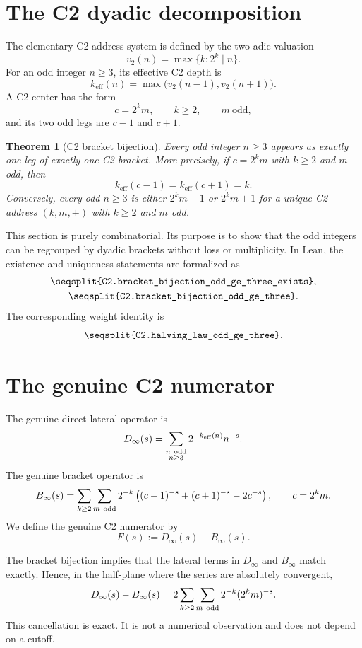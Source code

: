 \documentclass[11pt]{article}
\newtheorem{theorem}{Theorem}[section]
\newcommand{\Lean}[1]{\texttt{\seqsplit{#1}}}
\begin{document}
\section{The C2 dyadic decomposition}

The elementary C2 address system is defined by the two-adic valuation
\[
  v_2(n)=\max\{k:2^k\mid n\}.
\]
For an odd integer \(n\ge 3\), its effective C2 depth is
\[
  k_{\mathrm{eff}}(n)=
  \max\bigl(v_2(n-1),v_2(n+1)\bigr).
\]
A C2 center has the form
\[
  c=2^k m,\qquad k\ge 2,\qquad m\ \text{odd},
\]
and its two odd legs are \(c-1\) and \(c+1\).

\begin{theorem}[C2 bracket bijection]
Every odd integer \(n\ge 3\) appears as exactly one leg of exactly one C2
bracket.  More precisely, if \(c=2^k m\) with \(k\ge 2\) and \(m\) odd, then
\[
  k_{\mathrm{eff}}(c-1)=k_{\mathrm{eff}}(c+1)=k.
\]
Conversely, every odd \(n\ge 3\) is either \(2^k m-1\) or \(2^k m+1\) for a
unique C2 address \((k,m,\pm)\) with \(k\ge2\) and \(m\) odd.
\end{theorem}

This section is purely combinatorial.  Its purpose is to show that the
odd integers can be regrouped by dyadic brackets without loss or multiplicity.
In Lean, the existence and uniqueness statements are formalized as
\[
\begin{gathered}
\Lean{C2.bracket\_bijection\_odd\_ge\_three\_exists},\\
\Lean{C2.bracket\_bijection\_odd\_ge\_three}.
\end{gathered}
\]
The corresponding weight identity is
\[
  \Lean{C2.halving\_law\_odd\_ge\_three}.
\]

\section{The genuine C2 numerator}

The genuine direct lateral operator is
\[
  D_\infty(s)
  =
  \sum_{\substack{n\ {\rm odd}\\ n\ge3}}
    2^{-k_{\mathrm{eff}}(n)} n^{-s}.
\]
The genuine bracket operator is
\[
  B_\infty(s)
  =
  \sum_{k\ge2}\sum_{\substack{m\ {\rm odd}}}
    2^{-k}\left((c-1)^{-s}+(c+1)^{-s}-2c^{-s}\right),
  \qquad c=2^k m.
\]
We define the genuine C2 numerator by
\[
  F(s):=D_\infty(s)-B_\infty(s).
\]

The bracket bijection implies that the lateral terms in \(D_\infty\) and
\(B_\infty\) match exactly.  Hence, in the half-plane where the series are
absolutely convergent,
\[
  D_\infty(s)-B_\infty(s)
  =
  2\sum_{k\ge2}\sum_{\substack{m\ {\rm odd}}}
    2^{-k}(2^k m)^{-s}.
\]
This cancellation is exact.  It is not a numerical observation and does not
depend on a cutoff.
\end{document}
